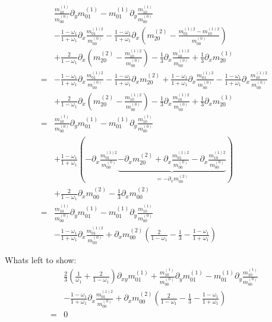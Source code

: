 \documentclass{article}
\begin{document}
\begin{align*}
  &
   \frac{m_{10}^{(1)}}{m_{00}^{(0)}} \partial_y m_{01}^{(1)}
  - m_{01}^{(1)} \partial_y \frac{m_{10}^{(1)}}{m_{00}^{(0)}}
  \\&
  - \frac{1 - \omega_1}{1 + \omega_1} \partial_x \frac{m_{01}^{(1)2}}{m_{00}^{(0)}}
  - \frac{1 - \omega_1}{1 + \omega_1} \partial_x \left(m_{20}^{(2)} - \frac{m_{01}^{(1)2} - m_{10}^{(1)2}}{m_{00}^{(0)}}\right)
  \\&
  + \frac{2}{1-\omega_1} \partial_x\left(m_{20}^{(2)} - \frac{m_{10}^{(1)2}}{m_{00}^{(0)}}\right)
  - \frac{1}{3} \partial_x \frac{m_{10}^{(1)2}}{m_{00}^{(0)}}
  + \frac{1}{3} \partial_x m_{20}^{(1)}
  \\=&
  - \frac{1 - \omega_1}{1 + \omega_1} \partial_x \frac{m_{01}^{(1)2}}{m_{00}^{(0)}}
  - \frac{1 - \omega_1}{1 + \omega_1} \partial_x m_{20}^{(2)}
  + \frac{1 - \omega_1}{1 + \omega_1} \partial_x \frac{m_{01}^{(1)2}}{m_{00}^{(0)}}
  - \frac{1 - \omega_1}{1 + \omega_1} \partial_x \frac{m_{10}^{(1)2}}{m_{00}^{(0)}}
  \\&
  + \frac{2}{1-\omega_1}\partial_x \left(m_{20}^{(2)} - \frac{m_{10}^{(1)2}}{m_{00}^{(0)}}\right)
  - \frac{1}{3} \partial_x \frac{m_{10}^{(1)2}}{m_{00}^{(0)}}
  + \frac{1}{3} \partial_x m_{20}^{(1)}
  \\=&
   \frac{m_{10}^{(1)}}{m_{00}^{(0)}} \partial_y m_{01}^{(1)}
  - m_{01}^{(1)} \partial_y \frac{m_{10}^{(1)}}{m_{00}^{(0)}}
  \\&
  + \frac{1 - \omega_1}{1 + \omega_1}\left(
  - \partial_x \frac{m_{01}^{(1)2}}{m_{00}^{(0)}}
  \underbrace{
  - \partial_x m_{20}^{(2)}
  + \partial_x \frac{m_{01}^{(1)2}}{m_{00}^{(0)}}
  - \partial_x \frac{m_{10}^{(1)2}}{m_{00}^{(0)}}
  }_{=-\partial_x m_{00}^{(2)}}
  \right)
  \\&
  + \frac{2}{1-\omega_1} \partial_x m_{00}^{(2)}
  - \frac{1}{3} \partial_x m_{00}^{(2)}
  \\=&
  \frac{m_{10}^{(1)}}{m_{00}^{(0)}} \partial_y m_{01}^{(1)}
  - m_{01}^{(1)} \partial_y \frac{m_{10}^{(1)}}{m_{00}^{(0)}}
  \\&
  - \frac{1 - \omega_1}{1 + \omega_1} \partial_x \frac{m_{01}^{(1)2}}{m_{00}^{(0)}}
  + \partial_x m_{00}^{(2)} \left(\frac{2}{1-\omega_1} - \frac{1}{3} - \frac{1 - \omega_1}{1 + \omega_1}\right)
\end{align*}

Whats left to show:
\begin{align*}
  &
  \frac{2}{3}\left(\frac{1}{\omega_1} + \frac{2}{1-\omega_1} \right) \partial_{xy}m_{01}^{(1)} + \frac{m_{10}^{(1)}}{m_{00}^{(0)}} \partial_y m_{01}^{(1)}
  - m_{01}^{(1)} \partial_y \frac{m_{10}^{(1)}}{m_{00}^{(0)}}
  \\&
  - \frac{1 - \omega_1}{1 + \omega_1} \partial_x \frac{m_{01}^{(1)2}}{m_{00}^{(0)}}
  + \partial_x m_{00}^{(2)} \left(\frac{2}{1-\omega_1} - \frac{1}{3} - \frac{1 - \omega_1}{1 + \omega_1}\right)
  \\=&0
\end{align*}
\end{document}
